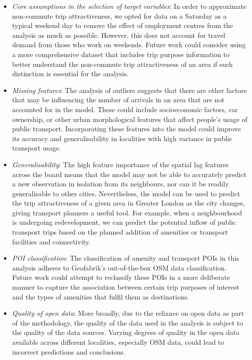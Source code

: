 \begin{itemize}
    \setlength\itemsep{0em}
    \item \textit{Core assumptions in the selection of target variables}: In order to approximate non-commute trip attractiveness, we opted for data on a Saturday as a typical weekend day to remove the effect of employment centres from the analysis as much as possible. However, this does not account for travel demand from those who work on weekends. Future work could consider using a more comprehensive dataset that includes trip purpose information to better understand the non-commute trip attractiveness of an area if such distinction is essential for the analysis. 
    \item \textit{Missing features}: The analysis of outliers suggests that there are other factors that may be influencing the number of arrivals in an area that are not accounted for in the model. These could include socioeconomic factors, car ownership, or other urban morphological features that affect people's usage of public transport. Incorporating these features into the model could improve its accuracy and generalisability in localities with high variance in public transport usage.
    \item \textit{Generalisability}: The high feature importance of the spatial lag features across the board means that the model may not be able to accurately predict a new observation in isolation from its neighbours, nor can it be readily generalisable to other cities. Nevertheless, the model can be used to predict the trip attractiveness of a given area in Greater London as the city changes, giving transport planners a useful tool. For example, when a neighbourhood is undergoing redevelopment, we can predict the potential inflow of public transport trips based on the planned addition of amenities or transport facilities and connectivity.
    \item \textit{POI classification}: The classification of amenity and transport POIs in this analysis adheres to Geofabrik's out-of-the-box OSM data classification. Future work could attempt to reclassify these POIs in a more deliberate manner to capture the association between certain trip purposes of interest and the types of amenities that fulfil them as destinations.
    \item \textit{Quality of open data}: More broadly, due to the reliance on open data as part of the methodology, the quality of the data used in the analysis is subject to the quality of the data sources. Varying degrees of quality in the open data available across different localities, especially OSM data, could lead to incorrect predictions and conclusions. 
\end{itemize}

